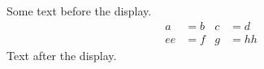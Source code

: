 \documentclass[12pt]{article}
\begin{document}
Some text before the display.
\begin{align} a &= b & c &= d \\ ee &= f & g &= hh \end{align}
Text after the display.
\end{document}
